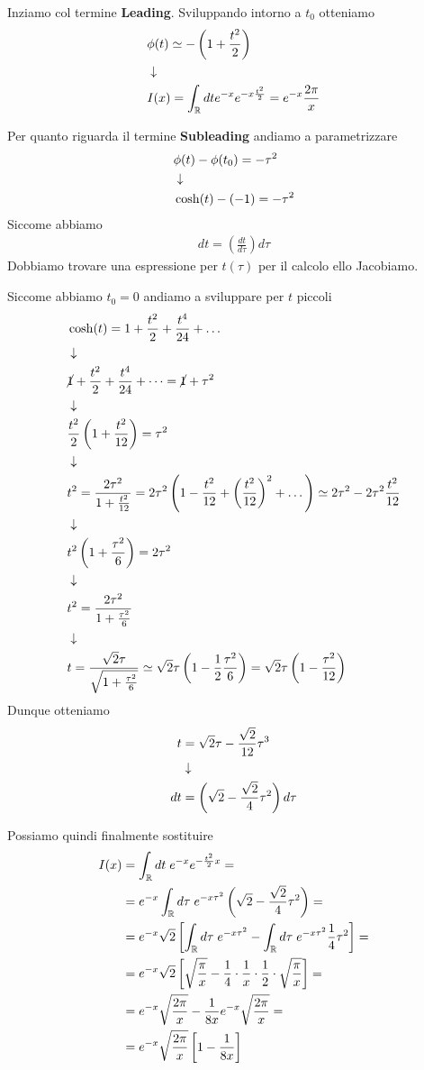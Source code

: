 Inziamo col termine \textbf{Leading}. Sviluppando intorno a $t_0$ otteniamo
\begin{align}
	&\phi(t) \simeq -\left( 1 + \frac{t^2}{2} \right)\\ &\downarrow \nonumber \\
	&I(x) = \int_{\mathbb{R}} dt e^{-x}e^{-x \frac{t^2}{2}} = e^{-x} \frac{2\pi}{x}	
\end{align}

Per quanto riguarda il termine \textbf{Subleading} andiamo a parametrizzare
\begin{align}
	&\phi(t) - \phi(t_0) = -\tau^2 \\ &\downarrow \nonumber \\
	& \cosh(t) -(-1) = -\tau^2
\end{align}
Siccome abbiamo
\begin{align}
	dt = \left( \frac{dt}{d\tau} \right) d\tau
\end{align}
Dobbiamo trovare una espressione per $t(\tau)$ per il calcolo ello Jacobiamo.

Siccome abbiamo $t_0 = 0$ andiamo a sviluppare per $t$ piccoli
\begin{align}
	&\cosh(t) = 1 + \frac{t^2}{2} + \frac{t^4}{24} + \dots \\ &\downarrow \nonumber \\
	&\cancel{1} + \frac{t^2}{2} + \frac{t^4}{24} + \dots = \cancel{1} + \tau^2 \nonumber \\ &\downarrow \nonumber \\
	&\frac{t^2}{2} \left( 1 + \frac{t^2}{12} \right) = \tau^2 \\ &\downarrow \nonumber \\
	&t^2 = \frac{2\tau^2}{1 + \frac{t^2}{12}} = 2\tau^2 \left( 1 - \frac{t^2}{12} + \left( \frac{t^2}{12} \right)^2 + \dots \right) \simeq 2\tau^2 - 2\tau^2 \frac{t^2}{12} \\ &\downarrow \nonumber \\
	&t^2 \left( 1 + \frac{\tau^2}{6} \right) = 2\tau^2 \nonumber \\ &\downarrow \nonumber \\
	&t^2=\frac{2\tau^2}{1 + \frac{\tau^2}{6}}\nonumber \\ &\downarrow \nonumber \\
	&t=\frac{\sqrt{2}\tau}{\sqrt{1 + \frac{\tau^2}{6}}} \simeq \sqrt{2}\tau \left( 1 - \frac{1}{2} \frac{\tau^2}{6} \right) = \sqrt{2}\tau \left( 1 - \frac{\tau^2}{12} \right)
\end{align}
Dunque otteniamo
\begin{align}
	t &= \sqrt{2} \tau - \frac{\sqrt{2}}{12}\tau^3 \\ &\downarrow \nonumber \\
	dt &= \left( \sqrt{2} - \frac{\sqrt{2}}{4}\tau^2 \right)d\tau 
\end{align}

Possiamo quindi finalmente sostituire
\begin{align}
	I(x) &= \int_{\mathbb{R}} dt \; e^{-x} e^{-\frac{t^2}{2} x} = \nonumber \\
	&= e^{-x} \int_{\mathbb{R}} d\tau \; e^{-x\tau^2}  \left( \sqrt{2} - \frac{\sqrt{2}}{4}\tau^2 \right) = \nonumber \\
	&= e^{-x}\sqrt{2} \left[ \int_{\mathbb{R}} d\tau \; e^{-x\tau^2}   -\int_{\mathbb{R}} d\tau \;e^{-x\tau^2}  \frac{1}{4}\tau^2  \right]= \nonumber \\
	&= e^{-x}\sqrt{2} \left[ \sqrt{\frac{\pi}{x}}   - \frac{1}{4}\cdot\frac{1}{x} \cdot \frac{1}{2} \cdot \sqrt{\frac{\pi}{x}}  \right]= \nonumber \\
	&=e^{-x}\sqrt{\frac{2\pi}{x}} - \frac{1}{8x}e^{-x}\sqrt{\frac{2\pi}{x}}= \nonumber \\
	&=e^{-x}\sqrt{\frac{2\pi}{x}}\left[1 - \frac{1}{8x}\right]
\end{align}

